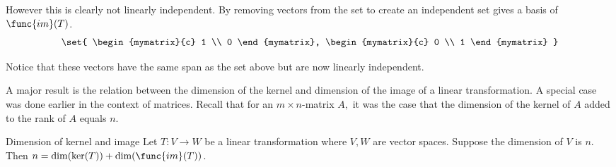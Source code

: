 \begin{solution}
However this is clearly not linearly independent. By removing vectors from the set to create an independent set gives a basis of $\func{im}(T)$.
\[
\set{
\begin{mymatrix}{c}
1 \\ 
0
\end{mymatrix}, 
\begin{mymatrix}{c}
0 \\ 
1
\end{mymatrix}
}
\]

Notice that these vectors have the same span as the set above but are now linearly independent.
\end{solution}

A major result is the relation between the dimension of the kernel and
dimension of the image of a linear transformation. A special case was done
earlier in the context of matrices. Recall that for an $m\times n$-matrix $%
A, $ it was the case that the dimension of the kernel of $A$ added to the
rank of $A$ equals $n$. 

\begin{theorem}{Dimension of kernel and image}{}
Let $T:V\rightarrow W$ be a linear transformation where $V,W$ are vector
spaces. Suppose the dimension of $V$ is $n$.
Then $n=\dim (\ker (T)) +\dim (\func{im}
(T))$.
\end{theorem}

